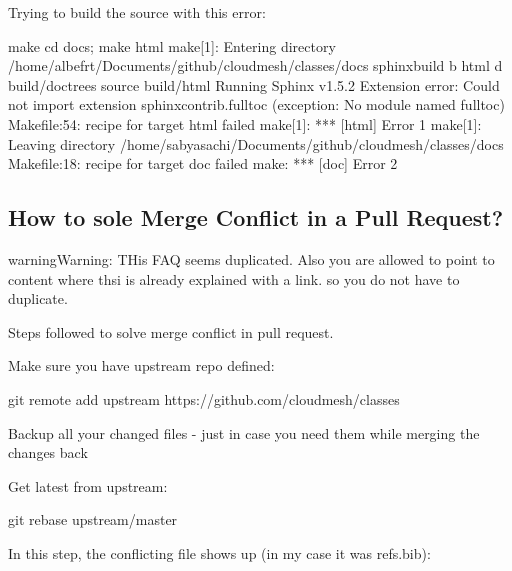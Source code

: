 Trying to build the source with this error:

\begin{sphinxVerbatim}[commandchars=\\\{\}]
\PYGZdl{} make
cd docs; make html
make[1]: Entering directory \PYGZsq{}/home/albefrt/Documents/github/cloudmesh/classes/docs\PYGZsq{}
sphinx\PYGZhy{}build \PYGZhy{}b html \PYGZhy{}d build/doctrees source build/html
Running Sphinx v1.5.2
Extension error:
Could not import extension sphinxcontrib.fulltoc (exception: No module named fulltoc)
Makefile:54: recipe for target \PYGZsq{}html\PYGZsq{} failed
make[1]: *** [html] Error 1
make[1]: Leaving directory \PYGZsq{}/home/sabyasachi/Documents/github/cloudmesh/classes/docs\PYGZsq{}
Makefile:18: recipe for target \PYGZsq{}doc\PYGZsq{} failed
make: *** [doc] Error 2
\end{sphinxVerbatim}


\subsection{How to sole Merge Conflict in a Pull Request?}
\label{\detokenize{faq:how-to-sole-merge-conflict-in-a-pull-request}}
\begin{sphinxadmonition}{warning}{Warning:}
THis FAQ seems duplicated. Also you are allowed to point
to content where thsi is already explained with a
link. so you do not have to duplicate.
\end{sphinxadmonition}

Steps followed to solve merge conflict in pull request.

Make sure you have upstream repo defined:

\begin{sphinxVerbatim}[commandchars=\\\{\}]
\PYGZdl{} git remote add upstream https://github.com/cloudmesh/classes
\end{sphinxVerbatim}

Backup all your changed files - just in case you need them while merging the changes back

Get latest from upstream:

\begin{sphinxVerbatim}[commandchars=\\\{\}]
\PYGZdl{} git rebase upstream/master
\end{sphinxVerbatim}

In this step, the conflicting file shows up (in my case it was refs.bib):

